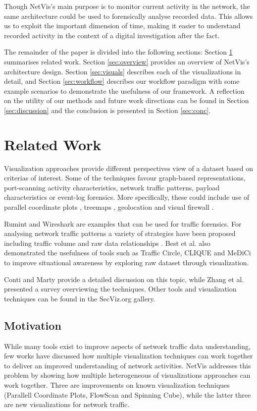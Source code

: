 Though NetVis's main purpose is to monitor current activity in the network, the same
architecture could be used to forensically analyse recorded data. This allows us to exploit the
important dimension of time, making it easier to understand recorded activity in the context of a
digital investigation after the fact.

The remainder of the paper is divided into the following sections: Section \ref{sec:relatedwork}
summarises related work. Section \ref{sec:overview} provides an overview of NetVis's architecture
design. Section \ref{sec:visuals} describes each of the visualizations in detail, and Section
\ref{sec:workflow} describes our workflow paradigm with some example scenarios to demonstrate the
usefulness of our framework. A reflection on the utility of our methods and future work directions
can be found in Section \ref{sec:discussion} and the conclusion is presented in Section \ref{sec:conc}.

\section{Related Work} \label{sec:relatedwork}
Visualization approaches provide different perspectives view of a dataset based on criterias of interest. Some of the techniques favour graph-based representations, port-scanning activity characteristics, network traffic patterns, payload characteristics or event-log forensics. More specifically, these could include use of parallel coordinate plots \cite{picviz}, treemaps \cite{johnson1991tree}, geolocation \cite{prole2008wireless} and visual firewall \cite{lee2005visual}. 

Rumint \cite{rumint} and Wireshark \cite{wireshark} are examples that can be used for traffic forensics. For analysing network traffic patterns a variety of strategies have been proposed including traffic volume \cite{plonka2000flowscan} and raw data relationships \cite{lau2004spinning}. Best et al. \cite{best2010} also demonstrated the usefulness of tools such as Traffic Circle, CLIQUE and MeDiCi to improve situational awareness by exploring raw dataset through visualization.

Conti \cite{Conti} and Marty \cite{marty2009applied} provide a detailed discussion on this topic, while Zhang et al. \cite{zhang2012survey} presented a survey overviewing the techniques. Other tools and visualization techniques can be found in the SecViz.org \cite{SECVIZ} gallery. 

\subsection{Motivation}
While many tools exist to improve aspects of network traffic data understanding, few works have discussed how multiple visualization techniques can work together to deliver an improved understanding of network activities. NetVis addresses this problem by showing how multiple heterogeneous of visualizations approaches can work together. Three are improvements on known visualization techniques (Parallell Coordinate Plots, FlowScan and Spinning Cube), while the latter three are new visualizations for network traffic.

